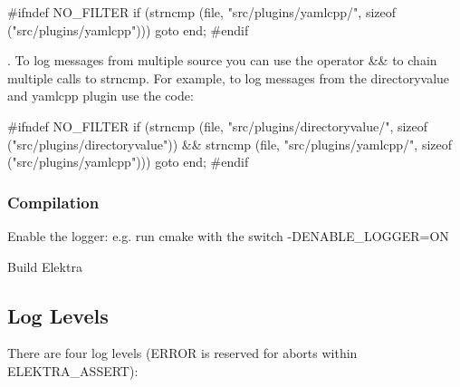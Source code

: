 \begin{DoxyCode}
\textcolor{preprocessor}{#ifndef NO\_FILTER}
     \textcolor{keywordflow}{if} (strncmp (file, \textcolor{stringliteral}{"src/plugins/yamlcpp/"}, \textcolor{keyword}{sizeof} (\textcolor{stringliteral}{"src/plugins/yamlcpp"}))) \textcolor{keywordflow}{goto} end;
\textcolor{preprocessor}{#endif}
\end{DoxyCode}


. To log messages from multiple source you can use the operator {\ttfamily \&\&} to chain multiple calls to {\ttfamily strncmp}. For example, to log messages from the {\ttfamily directoryvalue} and {\ttfamily yamlcpp} plugin use the code\+:


\begin{DoxyCode}
\textcolor{preprocessor}{#ifndef NO\_FILTER}
     \textcolor{keywordflow}{if} (strncmp (file, \textcolor{stringliteral}{"src/plugins/directoryvalue/"}, \textcolor{keyword}{sizeof} (\textcolor{stringliteral}{"src/plugins/directoryvalue"})) &&
         strncmp (file, \textcolor{stringliteral}{"src/plugins/yamlcpp/"}, \textcolor{keyword}{sizeof} (\textcolor{stringliteral}{"src/plugins/yamlcpp"})))
             \textcolor{keywordflow}{goto} end;
\textcolor{preprocessor}{#endif}
\end{DoxyCode}


\subsubsection*{Compilation}


\begin{DoxyEnumerate}
\item Enable the logger\+: e.\+g. run {\ttfamily cmake} with the switch {\ttfamily -\/\+D\+E\+N\+A\+B\+L\+E\+\_\+\+L\+O\+G\+G\+ER=ON}
\item Build Elektra
\end{DoxyEnumerate}

\subsection*{Log Levels}

There are four log levels (E\+R\+R\+OR is reserved for aborts within {\ttfamily E\+L\+E\+K\+T\+R\+A\+\_\+\+A\+S\+S\+E\+RT})\+:


